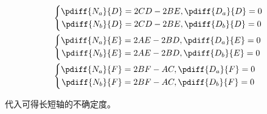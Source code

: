 \documentclass{article}
\begin{document}
\begin{align*}
  &\left\{
    \begin{aligned}
      \pdiff{N_a}{D}&=2CD-2BE,\pdiff{D_a}{D}=0\\
      \pdiff{N_b}{D}&=2CD-2BE,\pdiff{D_b}{D}=0\\ 
    \end{aligned}
  \right.\\
  &\left\{
    \begin{aligned}
      \pdiff{N_a}{E}&=2AE-2BD,\pdiff{D_a}{E}=0\\
      \pdiff{N_b}{E}&=2AE-2BD,\pdiff{D_b}{E}=0\\ 
    \end{aligned}
  \right.\\
  &\left\{
    \begin{aligned}
      \pdiff{N_a}{F}&=2BF-AC,\pdiff{D_a}{F}=0\\
      \pdiff{N_b}{F}&=2BF-AC,\pdiff{D_b}{F}=0\\ 
    \end{aligned}
  \right.
\end{align*}\par
代入可得长短轴的不确定度。
\end{document}
